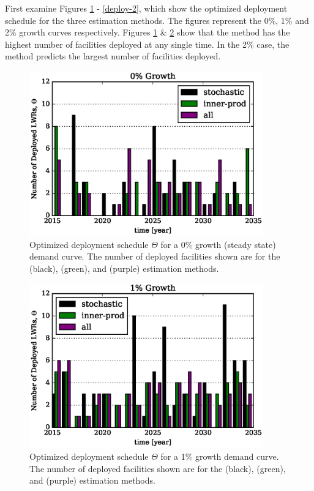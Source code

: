 First examine Figures \ref{deploy-0} - \ref{deploy-2}, which
show the optimized deployment schedule for the three estimation methods.
The figures represent the 0\%, 1\% and 2\% growth curves respectively.
Figures \ref{deploy-0} \& \ref{deploy-1} show that the \stochastic method
has the highest number of facilities deployed at any single time. In the 
2\% case, the \allflag method predicts the largest number of facilities 
deployed.

\begin{figure}[htb]
\centering
\includegraphics[width=0.9\textwidth]{deploy-0.eps}
\caption{Optimized deployment schedule $\Theta$ for a 0\% growth (steady 
state) demand curve. The number of deployed facilities shown are 
for the \stochastic (black), \innerprod (green), and \allflag (purple)
estimation methods.}
\label{deploy-0}
\end{figure}

\begin{figure}[htb]
\centering
\includegraphics[width=0.9\textwidth]{deploy-1.eps}
\caption{Optimized deployment schedule $\Theta$ for a 1\% growth 
demand curve. The number of deployed facilities shown are 
for the \stochastic (black), \innerprod (green), and \allflag (purple)
estimation methods.}
\label{deploy-1}
\end{figure}

